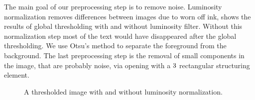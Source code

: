 The main goal of our preprocessing step is to remove noise. 
Luminosity normalization removes differences between images due to worn off ink,  shows the results of global thresholding with and without luminosity filter. Without this normalization step most of the text would have disappeared after the global thresholding. 
We use Otsu's \cite{otsu1975threshold} method to separate the foreground from the background. 
The last preprocessing step is the removal of small components in the image, that are probably noise, via opening with a $3 \time 3$ rectangular structuring element.

\begin{figure}[b!]
	\centering
	\hfil
	\caption{A thresholded image with \protect{} and without \protect{} luminosity normalization.}
	\label{fig:methods:preprocessing:lumNormalization}
\end{figure}